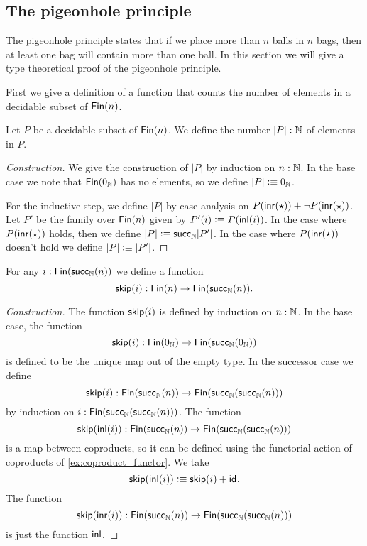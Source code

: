 \subsection{The pigeonhole principle}

The pigeonhole principle states that if we place more than $n$ balls in $n$ bags, then at least one bag will contain more than one ball. In this section we will give a type theoretical proof of the pigeonhole principle.

First we give a definition of a function that counts the number of elements in a decidable subset of $\mathsf{Fin}(n)$.

\begin{defn}
  Let $P$ be a decidable subset of $\mathsf{Fin}(n)$. We define the number $|P|:{\mathbb{N}}$ of elements in $P$.
\end{defn}

\begin{proof}[Construction]
  We give the construction of $|P|$ by induction on $n:{\mathbb{N}}$. In the base case we note that $\mathsf{Fin}(0_{{\mathbb{N}}})$ has no elements, so we define $|P|\vcentcolon\equiv0_{{\mathbb{N}}}$.

  For the inductive step, we define $|P|$ by case analysis on $P({\mathsf{inr}}(\star))+\neg P({\mathsf{inr}}(\star))$. Let $P'$ be the family over $\mathsf{Fin}(n)$ given by $P'(i)\vcentcolon\equiv P({\mathsf{inl}}(i))$. In the case where $P({\mathsf{inr}}(\star))$ holds, then we define $|P|\vcentcolon\equiv \mathsf{succ}_{{\mathbb{N}}} |P'|$. In the case where $P({\mathsf{inr}}(\star))$ doesn't hold we define $|P|\vcentcolon\equiv |P'|$.
\end{proof}

\begin{defn}
  For any $i:\mathsf{Fin}(\mathsf{succ}_{{\mathbb{N}}}(n))$ we define a function
  \begin{equation*}
    \mathsf{skip}(i):\mathsf{Fin}(n)\to\mathsf{Fin}(\mathsf{succ}_{{\mathbb{N}}}(n)).
  \end{equation*}
\end{defn}

\begin{proof}[Construction]
  The function $\mathsf{skip}(i)$ is defined by induction on $n:{\mathbb{N}}$. In the base case, the function
  \begin{equation*}
    \mathsf{skip}(i):\mathsf{Fin}(0_{{\mathbb{N}}})\to\mathsf{Fin}(\mathsf{succ}_{{\mathbb{N}}}(0_{{\mathbb{N}}}))
  \end{equation*}
  is defined to be the unique map out of the empty type. In the successor case we define
  \begin{equation*}
    \mathsf{skip}(i) : \mathsf{Fin}(\mathsf{succ}_{{\mathbb{N}}}(n))\to\mathsf{Fin}(\mathsf{succ}_{{\mathbb{N}}}(\mathsf{succ}_{{\mathbb{N}}}(n))) 
  \end{equation*}
  by induction on $i:\mathsf{Fin}(\mathsf{succ}_{{\mathbb{N}}}(\mathsf{succ}_{{\mathbb{N}}}(n)))$. The function
  \begin{equation*}
    \mathsf{skip}({\mathsf{inl}}(i)):\mathsf{Fin}(\mathsf{succ}_{{\mathbb{N}}}(n))\to\mathsf{Fin}(\mathsf{succ}_{{\mathbb{N}}}(\mathsf{succ}_{{\mathbb{N}}}(n)))
  \end{equation*}
  is a map between coproducts, so it can be defined using the functorial action of coproducts of \cref{ex:coproduct_functor}. We take
  \begin{equation*}
    \mathsf{skip}({\mathsf{inl}}(i))\vcentcolon\equiv \mathsf{skip}(i)+\mathsf{id}_{}.
  \end{equation*}
  The function 
  \begin{equation*}
    \mathsf{skip}({\mathsf{inr}}(i)):\mathsf{Fin}(\mathsf{succ}_{{\mathbb{N}}}(n))\to\mathsf{Fin}(\mathsf{succ}_{{\mathbb{N}}}(\mathsf{succ}_{{\mathbb{N}}}(n)))
  \end{equation*}
  is just the function ${\mathsf{inl}}$.
\end{proof}

